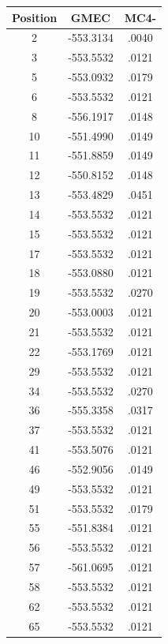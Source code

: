 \documentclass[a4paper,12pt]{article}
\begin{document}
    \begin{table}[!htbp]
      \centering

      \begin{tabular}{|c|c|c|}


        \hline
        Position & GMEC & MC4- \\
        \hline
        2 & -553.3134 & .0040 \\
        3 & -553.5532 & .0121 \\
        5 & -553.0932 & .0179 \\
        6 & -553.5532 & .0121 \\
        8 & -556.1917 & .0148 \\
        10 & -551.4990 & .0149 \\
        11 & -551.8859 & .0149 \\
        12 & -550.8152 & .0148 \\
        13 & -553.4829 & .0451 \\
        14 & -553.5532 & .0121 \\
        15 & -553.5532 & .0121 \\
        17 & -553.5532 & .0121 \\
        18 & -553.0880 & .0121 \\
        19 & -553.5532 & .0270 \\
        20 & -553.0003 & .0121 \\
        21 & -553.5532 & .0121 \\
        22 & -553.1769 & .0121 \\
        29 & -553.5532 & .0121 \\
        34 & -553.5532 & .0270 \\
        36 & -555.3358 & .0317 \\
        37 & -553.5532 & .0121 \\
        41 & -553.5076 & .0121 \\
        46 & -552.9056 & .0149 \\
        49 & -553.5532 & .0121 \\
        51 & -553.5532 & .0179 \\
        55 & -551.8384 & .0121 \\
        56 & -553.5532 & .0121 \\
        57 & -561.0695 & .0121 \\
        58 & -553.5532 & .0121 \\
        62 & -553.5532 & .0121 \\
        65 & -553.5532 & .0121 \\

\end{tabular}
\end{table}
\end{document}
